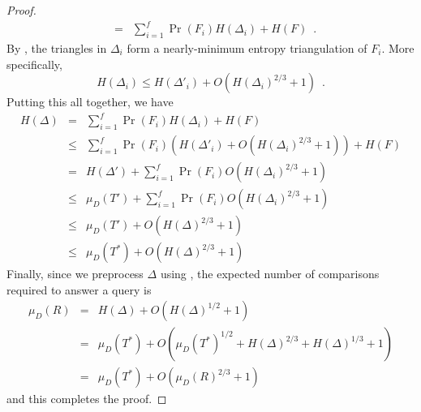 \documentclass[lotsofwhite]{patmorin}
\begin{document}
\begin{proof}
\begin{eqnarray*}
     & = & \sum_{i=1}^f \Pr(F_i) H(\Delta_i) + H(F) \enspace .
\end{eqnarray*}
By , the triangles in $\Delta_i$ form a
nearly-minimum entropy triangulation of $F_i$.  More specifically, 
\[  
   H(\Delta_i) \le H(\Delta'_i) + O(H(\Delta_i)^{2/3}+1)  \enspace .
\]
Putting this all together, we have
\begin{eqnarray*}
  H(\Delta) 
    &  =  & \sum_{i=1}^f\Pr(F_i) H(\Delta_i) + H(F) \\ 
    & \le & \sum_{i=1}^f\Pr(F_i) (H(\Delta'_i) + O(H(\Delta_i)^{2/3}+1)) + H(F) \\ 
    &  =  & H(\Delta') + \sum_{i=1}^f\Pr(F_i) O(H(\Delta_i)^{2/3}+1) \\ 
    & \le & \mu_D(T') + \sum_{i=1}^f\Pr(F_i) O(H(\Delta_i)^{2/3}+1) \\ 
    & \le & \mu_D(T') + O(H(\Delta)^{2/3}+1) \\
    & \le & \mu_D(T^*) + O(H(\Delta)^{2/3}+1)
\end{eqnarray*}
Finally, since we preprocess $\Delta$ using , the
expected number of comparisons required to answer a query is
\begin{eqnarray*}
  \mu_D(R) 
   & = & H(\Delta) + O(H(\Delta)^{1/2} + 1) \\
   & = & \mu_D(T^*) +  O(\mu_D(T^*)^{1/2} + H(\Delta)^{2/3} + H(\Delta)^{1/3} + 1) \\
   & = & \mu_D(T^*) + O(\mu_D(R)^{2/3} + 1)
\end{eqnarray*}
and this completes the proof.
\end{proof}



\end{document}
